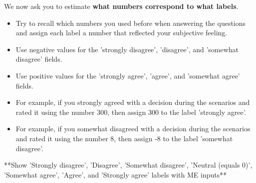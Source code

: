 \documentclass[a4paper]{article}
\begin{document}
We now ask you to estimate \textbf{what numbers correspond to what labels}.

\begin{itemize}
    \item Try to recall which numbers you used before when answering the questions and assign each label a number that reflected your subjective feeling.
    \item Use negative values for the 'strongly disagree', 'disagree', and 'somewhat disagree' fields.
    \item Use positive values for the 'strongly agree', 'agree', and 'somewhat agree' fields.
    \item For example, if you strongly agreed with a decision during the scenarios and rated it using the number 300, then assign 300 to the label 'strongly agree'.
    \item For example, if you somewhat disagreed with a decision during the scenarios and rated it using the number 8, then assign -8 to the label 'somewhat disagree'.
\end{itemize}

**Show 'Strongly disagree', 'Disagree', 'Somewhat disagree', 'Neutral (equals 0)', 'Somewhat agree', 'Agree', and 'Strongly agree' labels with ME inputs**



\end{document}
